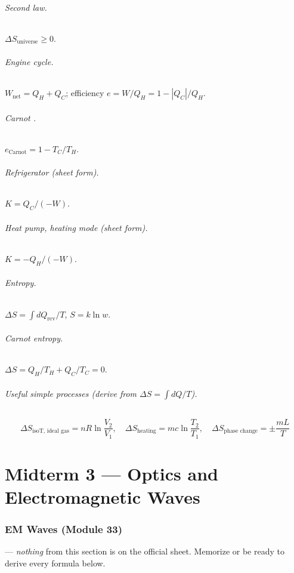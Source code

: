 \documentclass[11pt]{article}
\begin{document}
\paragraph{Second law.} $\Delta S_{\text{universe}} \ge 0$.
\paragraph{Engine cycle.} $W_{\text{net}} = Q_H + Q_C$; efficiency $e = W/Q_H = 1 - |Q_C|/Q_H$.
\paragraph{Carnot .} $e_{\text{Carnot}} = 1 - T_C/T_H$.
\paragraph{Refrigerator (sheet form).} $K = Q_C/(-W)$.
\paragraph{Heat pump, heating mode (sheet form).} $K = -Q_H/(-W)$.
\paragraph{Entropy.} $\Delta S = \int dQ_{\text{rev}}/T$, $S = k\ln w$.
\paragraph{Carnot entropy.} $\Delta S = Q_H/T_H + Q_C/T_C = 0$.
\paragraph{Useful simple processes  (derive from $\Delta S = \int dQ/T$).}
\[
\Delta S_{\text{isoT, ideal gas}} = nR\ln\frac{V_2}{V_1},\quad
\Delta S_{\text{heating}} = mc\ln\frac{T_2}{T_1},\quad
\Delta S_{\text{phase change}} = \pm\frac{mL}{T}
\]

\part*{Midterm 3 --- Optics and Electromagnetic Waves}

\section{EM Waves (Module 33)}
 --- \emph{nothing} from this section is on the official
sheet. Memorize or be ready to derive every formula below.
\end{document}
